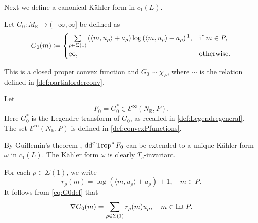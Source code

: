 Next we define a canonical K\"ahler form in $c_1(L)$.

Let $G_0\colon M_{\mathbb{R}}\rightarrow (-\infty,\infty]$ be defined as
\begin{equation}\label{eq:G0def}
G_0(m)\coloneqq
\begin{cases}
\sum\limits_{\rho \in \Sigma(1)} \left(\langle m, u_{\rho}\rangle +a_{\rho}\right)\log  \left(\langle m, u_{\rho}\rangle +a_{\rho}\right)\footnotemark,&\textup{if }m\in P,\\
\infty,& \textup{otherwise}.
\end{cases}
\end{equation}

This is a closed proper convex function and $G_0\sim \chi_P$, where $\sim$ is the relation defined in \cref{def:partialorderconv}.

Let
\begin{equation}\label{eq:F0def}
F_0=G_0^* \in \mathcal{E}^{\infty}(N_{\mathbb{R}},P).
\end{equation}
Here $G_0^*$ is the Legendre transform of $G_0$, as recalled in \cref{def:Legendregeneral}. The set $\mathcal{E}^{\infty}(N_{\mathbb{R}},P)$ is defined in \cref{def:convexPfunctions}.

By Guillemin's theorem \cite{Gui94, CDG03}, $\mathrm{dd}^{\mathrm{c}}\operatorname{Trop}^* F_0$ can be extended to a unique K\"ahler form $\omega$ in $c_1(L)$. The K\"ahler form $\omega$ is clearly $T_c$-invariant.

For each $\rho\in \Sigma(1)$, we write
\[
    r_{\rho}(m)=\log \left(\langle m,u_{\rho}\rangle +a_{\rho}\right)+1,\quad m\in P.
\]
It follows from \eqref{eq:G0def} that
\begin{equation}\label{eq:nablaG0}
    \nabla G_0(m)=\sum_{\rho\in \Sigma(1)} r_{\rho}(m)u_{\rho},\quad m\in \operatorname{Int} P.
\end{equation}


